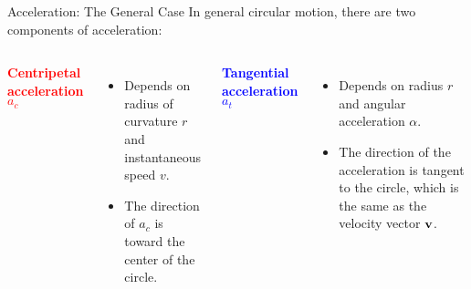\documentclass[12pt,compress,aspectratio=169]{beamer}
\newcommand{\mb}[1]{\ensuremath\mathbf{#1}}
\begin{document}
\begin{frame}{Acceleration: The General Case}
  In general circular motion, there are two components of acceleration:
  \vspace{.2in}
  \begin{columns}
    
    \textcolor{red}{\textbf{Centripetal acceleration} $a_c$}
    \begin{itemize}
    \item Depends on radius of curvature $r$ and instantaneous speed $v$.
    \item The direction of $a_c$ is toward the center of the circle.
    \end{itemize}
    \textcolor{blue}{\textbf{Tangential acceleration} $a_t$}
    \begin{itemize}
    \item Depends on radius $r$  and angular acceleration $\alpha$.
    \item The direction of the acceleration is tangent to the circle, which
      is the same as the velocity vector $\mb{v}$.
    \end{itemize}
  \end{columns}
\end{frame}
\end{document}
